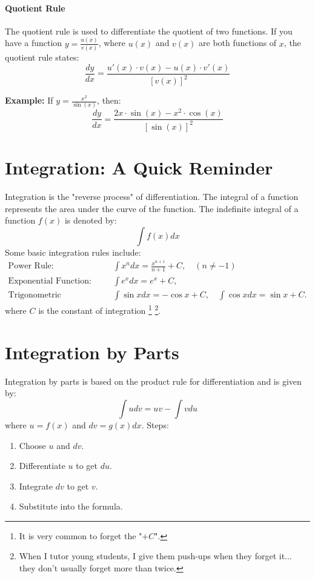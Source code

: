 \documentclass[]{article}
\begin{document}
	\paragraph{Quotient Rule}
	The quotient rule is used to differentiate the quotient of two functions.
	If you have a function $y = \frac{u(x)}{v(x)}$, where $u(x)$ and $v(x)$ are both functions of $x$, the quotient rule states:
	$$
	\frac{dy}{dx} = \frac{u'(x) \cdot v(x) - u(x) \cdot v'(x)}{[v(x)]^2}
	$$
	
	\noindent \textbf{Example:}
	If $y = \frac{x^2}{\sin(x)}$, then:
	$$
	\frac{dy}{dx} = \frac{2x \cdot \sin(x) - x^2 \cdot \cos(x)}{[\sin(x)]^2}
	$$
	
	\section{Integration: A Quick Reminder}
	Integration is the "reverse process" of differentiation.
	The integral of a function represents the area under the curve of the function.
	The indefinite integral of a function $f(x)$ is denoted by:
	$$
	\int f(x) dx
	$$
	Some basic integration rules include:
	\begin{align*}
		\text{Power Rule:} & \quad \int x^n dx = \frac{x^{n+1}}{n+1} + C, \quad (n \neq -1) \\
		\text{Exponential Function:} & \quad \int e^x dx = e^x + C, \\
		\text{Trigonometric Functions:} & \quad \int \sin x dx = -\cos x + C, \quad \int \cos x dx = \sin x + C.
	\end{align*}
	where $C$ is the constant of integration
	\footnote{It is very common to forget the "$+C$".}
	\footnote{When I tutor young students, I give them push-ups when they forget it... they don't usually forget more than twice.}.
		
	\section{Integration by Parts}
	Integration by parts is based on the product rule for differentiation and is given by:
	$$
	\int u dv = uv - \int v du
	$$
	where $u = f(x)$ and $dv = g(x) dx$. Steps:
	\begin{enumerate}
		\item Choose $u$ and $dv$.
		\item Differentiate $u$ to get $du$.
		\item Integrate $dv$ to get $v$.
		\item Substitute into the formula.
	\end{enumerate}
	
\end{document}
